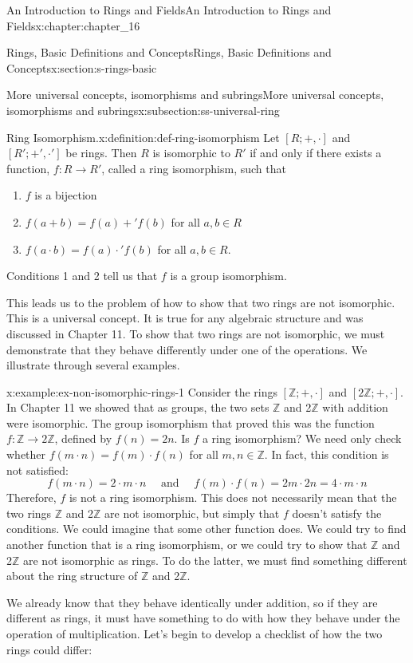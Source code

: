 \documentclass[oneside,10pt,]{book}
\numberwithin{equation}{section}
\begin{document}
\begin{chapterptx}{An Introduction to Rings and Fields}{}{An Introduction to Rings and Fields}{}{}{x:chapter:chapter_16}
\begin{sectionptx}{Rings, Basic Definitions and Concepts}{}{Rings, Basic Definitions and Concepts}{}{}{x:section:s-rings-basic}
\begin{subsectionptx}{More universal concepts, isomorphisms and subrings}{}{More universal concepts, isomorphisms and subrings}{}{}{x:subsection:ss-universal-ring}
\begin{definition}{Ring Isomorphism.}{x:definition:def-ring-isomorphism}
Let \([R; + , \cdot ]\) and \([R'; +', \cdot']\) be rings. Then  \(R\) is isomorphic to   \(R'\) if and only if there exists a function, \(f:R \to  R'\), called a ring isomorphism, such that%
\begin{enumerate}[label=(\arabic*)]
\item{}\(f\) is a bijection%
\item{}\(f(a + b) =f(a)+'f(b)\) for all \(a, b \in  R\)%
\item{}\(f(a \cdot  b) = f(a)\cdot ' f(b)\)  for all \(a,b \in  R\).%
\end{enumerate}
%
\end{definition}
Conditions 1 and 2 tell us that \(f\) is a group isomorphism.%
\par
This leads us to the problem of how to show that two rings are not isomorphic. This is a universal concept. It is true for any algebraic structure and was discussed in Chapter 11. To show that two rings are not isomorphic, we must demonstrate that they behave differently under one of the operations. We illustrate through several examples.%
\begin{example}{}{x:example:ex-non-isomorphic-rings-1}%
Consider the rings \([\mathbb{Z}; +, \cdot ]\) and \([2\mathbb{Z}; +, \cdot ]\). In Chapter 11 we showed that as groups, the two sets \(\mathbb{Z}\) and 2\(\mathbb{Z}\) with addition were isomorphic. The group isomorphism that proved this was the function \(f : \mathbb{Z} \to 2\mathbb{Z}\), defined by \(f(n) = 2n\).  Is \(f\) a ring isomorphism? We need only check whether \(f(m\cdot n) = f(m)\cdot f(n)\) for all \(m, n \in \mathbb{Z}\).  In fact, this condition is not satisfied:%
\begin{equation*}
f(m\cdot n) = 2\cdot m\cdot n \quad\textrm{ and }\quad
f(m)\cdot f(n)=2m\cdot 2n= 4\cdot m \cdot n
\end{equation*}
Therefore,  \(f\) is not a ring isomorphism. This does not necessarily mean that the two rings \(\mathbb{Z}\) and 2\(\mathbb{Z}\) are not isomorphic, but simply that \(f\) doesn't satisfy the conditions.  We could imagine that some other function does. We could  try to find another function that is a ring isomorphism, or we could try to show that \(\mathbb{Z}\) and 2\(\mathbb{Z}\) are not isomorphic as rings. To do the latter, we must find something different about the ring structure of \(\mathbb{Z}\) and 2\(\mathbb{Z}\).%
\par
We already know that they behave identically under addition, so if they are different as rings, it must have something to do with how they behave under the operation of multiplication. Let's begin to develop a checklist of how the two rings could differ:%

\end{example}
\end{subsectionptx}
\end{sectionptx}
\end{chapterptx}
\end{document}
